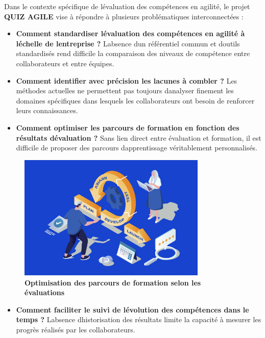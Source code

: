 \documentclass[12pt,a4paper,twoside,openright]{report}
\newcommand{\figcaption}[1]{\caption{\textbf{#1}}}
\begin{document}
Dans le contexte spécifique de l\textquotesingle évaluation des
compétences en agilité, le projet \textbf{QUIZ AGILE} vise à répondre à
plusieurs problématiques interconnectées :

\begin{itemize}
\item
  \textbf{Comment standardiser l\textquotesingle évaluation des
  compétences en agilité à l\textquotesingle échelle de
  l\textquotesingle entreprise ?} L\textquotesingle absence
  d\textquotesingle un référentiel commun et d\textquotesingle outils
  standardisés rend difficile la comparaison des niveaux de compétence
  entre collaborateurs et entre équipes.
\item
  \textbf{Comment identifier avec précision les lacunes à combler ?} Les
  méthodes actuelles ne permettent pas toujours
  d\textquotesingle analyser finement les domaines spécifiques dans
  lesquels les collaborateurs ont besoin de renforcer leurs
  connaissances.
\item
  \textbf{Comment optimiser les parcours de formation en fonction des
  résultats d\textquotesingle évaluation ?} Sans lien direct entre
  évaluation et formation, il est difficile de proposer des parcours
  d\textquotesingle apprentissage véritablement personnalisés.
\end{itemize}

\begin{figure}[H]
\centering
\includegraphics[width=0.8\textwidth]{latex_media/media/image7.jpeg}
\figcaption{Optimisation des parcours de formation selon les évaluations}
\label{fig:optimisation-parcours}
\end{figure}

\begin{itemize}
\item
  \textbf{Comment
  faciliter le suivi de l\textquotesingle évolution des compétences dans
  le temps ?} L\textquotesingle absence d\textquotesingle historisation
  des résultats limite la capacité à mesurer les progrès réalisés par
  les collaborateurs.
\end{itemize}
\end{document}
